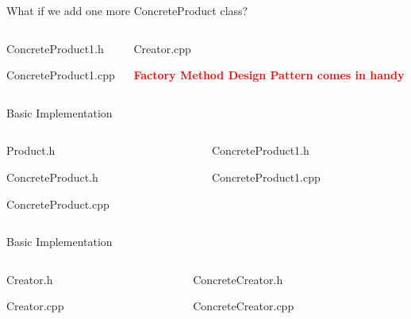 \documentclass[13pt]{beamer}
\begin{document}
\begin{frame}{What if we add one more ConcreteProduct class?}
\begin{columns}[T]
\begin{column}{.45\textwidth}
\lstset{basicstyle=\tiny,style=myCustomCppStyle}
ConcreteProduct1.h

ConcreteProduct1.cpp

\end{column}

\begin{column}{.45\textwidth}
\lstset{basicstyle=\tiny,style=myCustomCppStyle}
Creator.cpp

\textcolor{red}{\textbf{Factory Method Design Pattern comes in handy}}
\end{column}
\end{columns}
\end{frame}

\begin{frame}{Basic Implementation}
\begin{columns}[T]
\begin{column}{.45\textwidth}
\lstset{basicstyle=\tiny,style=myCustomCppStyle}
Product.h

ConcreteProduct.h

ConcreteProduct.cpp

\end{column}

\begin{column}{.45\textwidth}
\lstset{basicstyle=\tiny,style=myCustomCppStyle}
ConcreteProduct1.h

ConcreteProduct1.cpp

\end{column}
\end{columns}
\end{frame}

\begin{frame}{Basic Implementation}
\begin{columns}[T]
\begin{column}{.45\textwidth}
\lstset{basicstyle=\tiny,style=myCustomCppStyle}
Creator.h

Creator.cpp

\end{column}

\begin{column}{.45\textwidth}
\lstset{basicstyle=\tiny,style=myCustomCppStyle}
ConcreteCreator.h

ConcreteCreator.cpp

\end{column}
\end{columns}
\end{frame}
\end{document}

